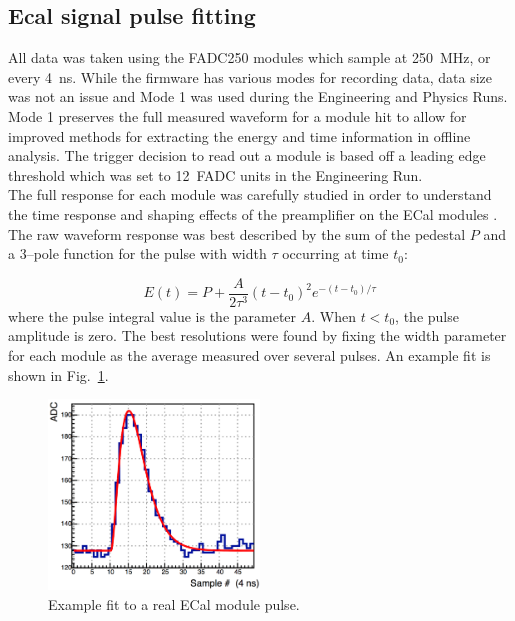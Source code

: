 \subsection{Ecal signal pulse fitting} \label{pulsefitting}
All data was taken using the FADC250 modules which sample at 250~MHz, or every 4~ns. While the firmware has various modes for recording data, data size was not an issue and Mode 1 was used during the Engineering and Physics Runs. Mode 1 preserves the full measured waveform for a module hit to allow for improved methods for extracting the energy and time information in offline analysis. The trigger decision to read out a module is based off a leading edge threshold which was set to 12~FADC units in the Engineering Run. \\
\indent The full response for each module was carefully studied in order to understand the time response and shaping effects of the preamplifier on the ECal modules \cite{charles_2014}. The raw waveform response was best described by the sum of the pedestal $P$ and a $3$--pole function for the pulse with width $\tau$ occurring at time $t_0$:

\begin{equation}
	\label{eq:thrpole}
	E(t) = P + \dfrac{A}{2\tau^3}(t-t_0)^2e^{-(t-t_0)/\tau} 
\end{equation}
where the pulse integral value is the parameter $A$. When $t<t_0$, the pulse amplitude is zero. The best resolutions were found by fixing the width parameter for each module as the average measured over several pulses. An example fit is shown in Fig.~\ref{Figure:mode1fit}.

\begin{figure}[htb]
  \centering
      \includegraphics[width=0.5\textwidth]{pics/performance/mode1fit.png}
  \caption[Pulse-fitting to Mode 1 ECal data]{Example fit to a real ECal module pulse.}
  \label{Figure:mode1fit}
\end{figure}

